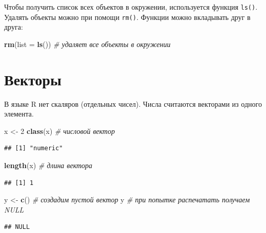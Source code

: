 \documentclass[
]{book}
\newenvironment{Shaded}{\begin{snugshade}}{\end{snugshade}}
\newcommand{\AttributeTok}[1]{\textcolor[rgb]{0.13,0.29,0.53}{#1}}
\newcommand{\CommentTok}[1]{\textcolor[rgb]{0.56,0.35,0.01}{\textit{#1}}}
\newcommand{\DecValTok}[1]{\textcolor[rgb]{0.00,0.00,0.81}{#1}}
\newcommand{\FunctionTok}[1]{\textcolor[rgb]{0.13,0.29,0.53}{\textbf{#1}}}
\newcommand{\NormalTok}[1]{#1}
\newcommand{\OtherTok}[1]{\textcolor[rgb]{0.56,0.35,0.01}{#1}}
\theoremstyle{definition}
\theoremstyle{definition}
\theoremstyle{definition}
\theoremstyle{definition}
\theoremstyle{remark}
\begin{document}
Чтобы получить список всех объектов в окружении, используется функция \texttt{ls()}. Удалять объекты можно при помощи \texttt{rm()}. Функции можно вкладывать друг в друга:

\begin{Shaded}
\begin{Highlighting}[]
\FunctionTok{rm}\NormalTok{(}\AttributeTok{list =} \FunctionTok{ls}\NormalTok{()) }\CommentTok{\# удаляет все объекты в окружении}
\end{Highlighting}
\end{Shaded}

\hypertarget{ux432ux435ux43aux442ux43eux440ux44b}{%
\section{Векторы}\label{ux432ux435ux43aux442ux43eux440ux44b}}

В языке R нет скаляров (отдельных чисел). Числа считаются векторами из одного элемента.

\begin{Shaded}
\begin{Highlighting}[]
\NormalTok{x }\OtherTok{\textless{}{-}} \DecValTok{2}
\FunctionTok{class}\NormalTok{(x) }\CommentTok{\# числовой вектор}
\end{Highlighting}
\end{Shaded}

\begin{verbatim}
## [1] "numeric"
\end{verbatim}

\begin{Shaded}
\begin{Highlighting}[]
\FunctionTok{length}\NormalTok{(x) }\CommentTok{\# длина вектора}
\end{Highlighting}
\end{Shaded}

\begin{verbatim}
## [1] 1
\end{verbatim}

\begin{Shaded}
\begin{Highlighting}[]
\NormalTok{y }\OtherTok{\textless{}{-}} \FunctionTok{c}\NormalTok{() }\CommentTok{\# создадим пустой вектор}
\NormalTok{y }\CommentTok{\# при попытке распечатать получаем NULL }
\end{Highlighting}
\end{Shaded}

\begin{verbatim}
## NULL
\end{verbatim}
\end{document}
